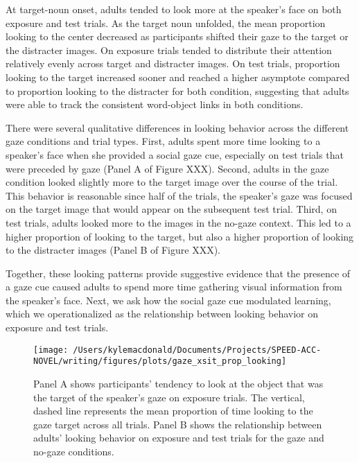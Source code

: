\documentclass[man,floatsintext]{apa6}
\begin{document}
At target-noun onset, adults tended to look more at the speaker's face
on both exposure and test trials. As the target noun unfolded, the mean
proportion looking to the center decreased as participants shifted their
gaze to the target or the distracter images. On exposure trials tended
to distribute their attention relatively evenly across target and
distracter images. On test trials, proportion looking to the target
increased sooner and reached a higher asymptote compared to proportion
looking to the distracter for both condition, suggesting that adults
were able to track the consistent word-object links in both conditions.

There were several qualitative differences in looking behavior across
the different gaze conditions and trial types. First, adults spent more
time looking to a speaker's face when she provided a social gaze cue,
especially on test trials that were preceded by gaze (Panel A of Figure
XXX). Second, adults in the gaze condition looked slightly more to the
target image over the course of the trial. This behavior is reasonable
since half of the trials, the speaker's gaze was focused on the target
image that would appear on the subsequent test trial. Third, on test
trials, adults looked more to the images in the no-gaze context. This
led to a higher proportion of looking to the target, but also a higher
proportion of looking to the distracter images (Panel B of Figure XXX).

Together, these looking patterns provide suggestive evidence that the
presence of a gaze cue caused adults to spend more time gathering visual
information from the speaker's face. Next, we ask how the social gaze
cue modulated learning, which we operationalized as the relationship
between looking behavior on exposure and test trials.

\begin{figure}[!t]

{\centering \texttt{[image: /Users/kylemacdonald/Documents/Projects/SPEED-ACC-NOVEL/writing/figures/plots/gaze\_xsit\_prop\_looking]} 

}

\caption{Panel A shows participants’ tendency to look at the object that was the target of the speaker’s gaze on exposure trials. The vertical, dashed line represents the mean proportion of time looking to the gaze target across all trials. Panel B shows the relationship between adults' looking behavior on exposure and test trials for the gaze and no-gaze conditions.}\label{fig:gaze-xsit-prop-looking-plot}
\end{figure}
\end{document}
